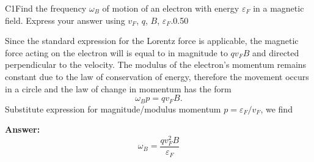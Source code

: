\documentclass[11pt,a4paper]{article}
\begin{document}
\begin{solcard}{C1}{Find the frequency $\omega_B$ of motion of an electron with energy $\varepsilon_F$ in a magnetic field. Express your answer using $v_F$, $q$, $B$, $\varepsilon_F$.}{0.50}

Since the standard expression for the Lorentz force is applicable, the magnetic force acting on the electron will is equal to in magnitude to $qv_F B$ and directed perpendicular to the velocity. The modulus of the electron's momentum remains constant due to the law of conservation of energy, therefore the movement occurs in a circle and the law of change in momentum has the form $$ \omega_B p= q v_F B. $$Substitute expression for magnitude/modulus momentum $p = \varepsilon_F/v_F$, we find

\par\smallskip\noindent\textbf{Answer:} $$ \omega_B = \frac{q v_F^2 B}{\varepsilon_F} $$
\end{solcard}
\end{document}
